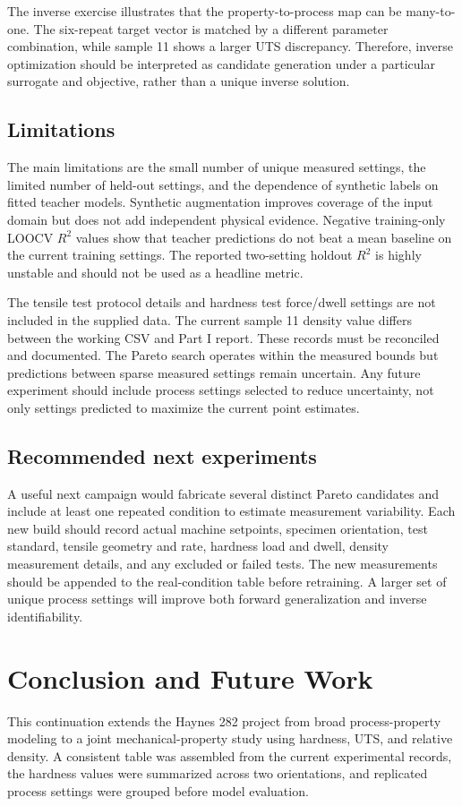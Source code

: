 \documentclass[12pt,a4paper,oneside]{report}
\begin{document}
The inverse exercise illustrates that the property-to-process map can be many-to-one. The six-repeat target vector is matched by a different parameter combination, while sample 11 shows a larger UTS discrepancy. Therefore, inverse optimization should be interpreted as candidate generation under a particular surrogate and objective, rather than a unique inverse solution.

\section{Limitations}
The main limitations are the small number of unique measured settings, the limited number of held-out settings, and the dependence of synthetic labels on fitted teacher models. Synthetic augmentation improves coverage of the input domain but does not add independent physical evidence. Negative training-only LOOCV $R^2$ values show that teacher predictions do not beat a mean baseline on the current training settings. The reported two-setting holdout $R^2$ is highly unstable and should not be used as a headline metric.

The tensile test protocol details and hardness test force/dwell settings are not included in the supplied data. The current sample 11 density value differs between the working CSV and Part I report. These records must be reconciled and documented. The Pareto search operates within the measured bounds but predictions between sparse measured settings remain uncertain. Any future experiment should include process settings selected to reduce uncertainty, not only settings predicted to maximize the current point estimates.

\section{Recommended next experiments}
A useful next campaign would fabricate several distinct Pareto candidates and include at least one repeated condition to estimate measurement variability. Each new build should record actual machine setpoints, specimen orientation, test standard, tensile geometry and rate, hardness load and dwell, density measurement details, and any excluded or failed tests. The new measurements should be appended to the real-condition table before retraining. A larger set of unique process settings will improve both forward generalization and inverse identifiability.

\chapter{Conclusion and Future Work}
This continuation extends the Haynes 282 project from broad process-property modeling to a joint mechanical-property study using hardness, UTS, and relative density. A consistent table was assembled from the current experimental records, the hardness values were summarized across two orientations, and replicated process settings were grouped before model evaluation.
\end{document}
